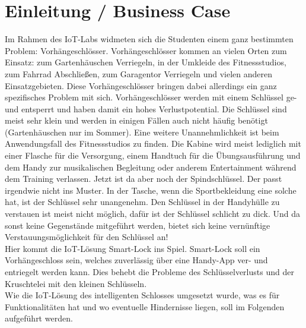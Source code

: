
\chapter{Einleitung / Business Case}
Im Rahmen des \ac{IoT}-Labs widmeten sich die Studenten einem ganz bestimmten Problem: Vorhängeschlösser. Vorhängeschlösser kommen an vielen Orten zum Einsatz: zum Gartenhäuschen Verriegeln, in der Umkleide des Fitnessstudios, zum Fahrrad Abschließen, zum Garagentor Verriegeln und vielen anderen Einsatzgebieten. Diese Vorhängeschlösser bringen dabei allerdings ein ganz spezifisches Problem mit sich. Vorhängeschlösser werden mit einem Schlüssel ge- und entsperrt und haben damit ein hohes Verlustpotential. Die Schlüssel sind meist sehr klein und werden in einigen Fällen auch nicht häufig benötigt (Gartenhäuschen nur im Sommer). Eine weitere Unannehmlichkeit ist beim Anwendungsfall des Fitnessstudios zu finden. Die Kabine wird meist lediglich mit einer Flasche für die Versorgung, einem Handtuch für die Übungsausführung und dem Handy zur musikalischen Begleitung oder anderem Entertainment während dem Training verlassen. Jetzt ist da aber noch der Spindschlüssel. Der passt irgendwie nicht ins Muster. In der Tasche, wenn die Sportbekleidung eine solche hat, ist der Schlüssel sehr unangenehm. Den Schlüssel in der Handyhülle zu verstauen ist meist nicht möglich, dafür ist der Schlüssel schlicht zu dick. Und da sonst keine Gegenstände mitgeführt werden, bietet sich keine vernünftige Verstauungsmöglichkeit für den Schlüssel an! 
\\ 
Hier kommt die \ac{IoT}-Lösung Smart-Lock ins Spiel. Smart-Lock soll ein Vorhängeschloss sein, welches zuverlässig über eine Handy-App ver- und entriegelt werden kann. Dies behebt die Probleme des Schlüsselverlusts und der \glqq Kruschtelei\grqq{} mit den kleinen Schlüsseln.
\\ 
Wie die \ac{IoT}-Lösung des intelligenten Schlosses umgesetzt wurde, was es für Funktionalitäten hat und wo eventuelle Hindernisse liegen, soll im Folgenden aufgeführt werden.